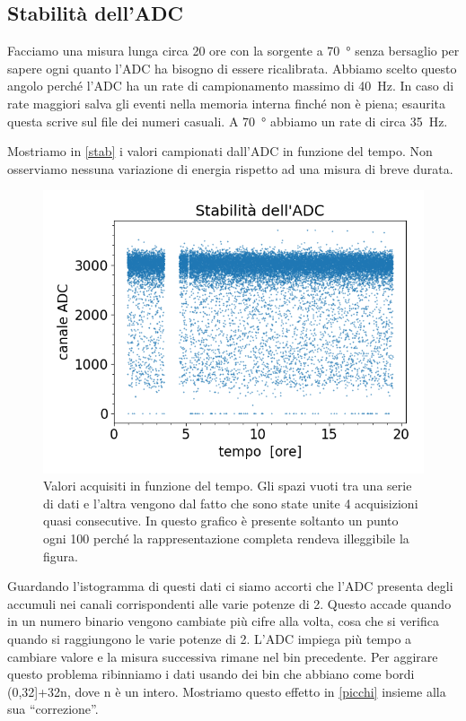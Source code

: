 \subsection{Stabilità dell'ADC}

Facciamo una misura lunga circa 20 ore con la sorgente a \SI{70}{\degree} senza bersaglio per sapere ogni quanto l'ADC ha bisogno di essere ricalibrata. 
Abbiamo scelto questo angolo perché l'ADC ha un rate di campionamento massimo di \SI{40}{Hz}. In caso di rate maggiori salva gli eventi nella memoria interna finché non è piena; esaurita questa scrive sul file dei numeri casuali.
A \SI{70}{\degree} abbiamo un rate di circa \SI{35}{Hz}.

Mostriamo in \autoref{stab} i valori campionati dall'ADC in funzione del tempo. Non osserviamo nessuna variazione di energia rispetto ad una misura di breve durata.

\begin{figure}[h]
\centering
\includegraphics[width=30 em]{immagini/stab.png}
\caption{Valori acquisiti in funzione del tempo. Gli spazi vuoti tra una serie di dati e l'altra vengono dal fatto che sono state unite 4 acquisizioni quasi consecutive.
In questo grafico è presente soltanto un punto ogni 100 perché la rappresentazione completa rendeva illeggibile la figura.}
\label{stab}
\end{figure}

Guardando l'istogramma di questi dati ci siamo accorti che l'ADC presenta degli accumuli nei canali corrispondenti alle varie potenze di 2. Questo accade quando in un numero binario vengono cambiate più cifre alla volta, cosa che si verifica quando si raggiungono le varie potenze di 2. L'ADC impiega più tempo a cambiare valore e la misura successiva rimane nel bin precedente.
Per aggirare questo problema ribinniamo i dati usando dei bin che abbiano come bordi (0,32]+32n, dove n è un intero. Mostriamo questo effetto in \autoref{picchi} insieme alla sua ``correzione''.


